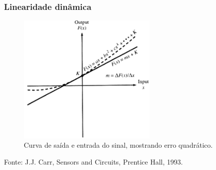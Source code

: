 \documentclass{beamer}
\begin{document}
\begin{frame}
	\frametitle{Linearidade dinâmica}
	\begin{figure}
		\includegraphics[width=0.6\textwidth]{linearidadedinamicaerroquadratico}
		\caption{Curva de saída e entrada do sinal, mostrando erro quadrático.}
	\end{figure}  	
	{\scriptsize Fonte: J.J. Carr, Sensors and Circuits, Prentice Hall, 1993.}
\end{frame}

\frame{\titlepage}
\end{document}
